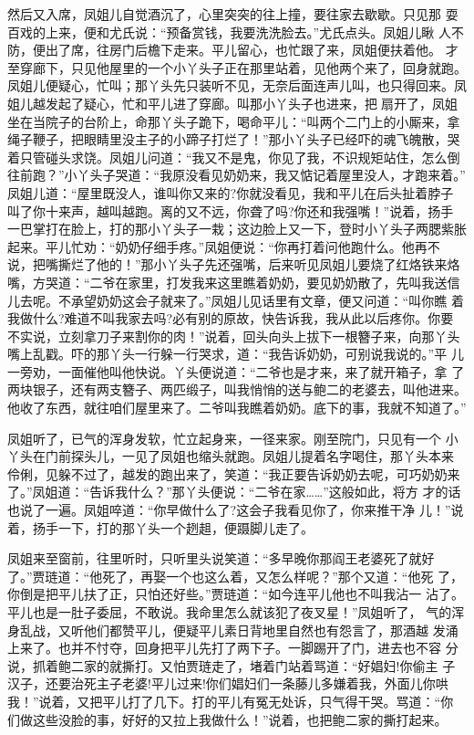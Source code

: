 然后又入席，凤姐儿自觉酒沉了，心里突突的往上撞，要往家去歇歇。只见那
耍百戏的上来，便和尤氏说：“预备赏钱，我要洗洗脸去。”尤氏点头。凤姐儿瞅
人不防，便出了席，往房门后檐下走来。平儿留心，也忙跟了来，凤姐便扶着他。
才至穿廊下，只见他屋里的一个小丫头子正在那里站着，见他两个来了，回身就跑。
凤姐儿便疑心，忙叫；那丫头先只装听不见，无奈后面连声儿叫，也只得回来。凤
姐儿越发起了疑心，忙和平儿进了穿廊。叫那小丫头子也进来，把扇开了，凤姐
坐在当院子的台阶上，命那丫头子跪下，喝命平儿：“叫两个二门上的小厮来，拿
绳子鞭子，把眼睛里没主子的小蹄子打烂了！”那小丫头子已经吓的魂飞魄散，哭
着只管碰头求饶。凤姐儿问道：“我又不是鬼，你见了我，不识规矩站住，怎么倒
往前跑？”小丫头子哭道：“我原没看见奶奶来，我又惦记着屋里没人，才跑来着。”
凤姐儿道：“屋里既没人，谁叫你又来的?你就没看见，我和平儿在后头扯着脖子
叫了你十来声，越叫越跑。离的又不远，你聋了吗?你还和我强嘴！”说着，扬手
一巴掌打在脸上，打的那小丫头子一栽；这边脸上又一下，登时小丫头子两腮紫胀
起来。平儿忙劝：“奶奶仔细手疼。”凤姐便说：“你再打着问他跑什么。他再不
说，把嘴撕烂了他的！”那小丫头子先还强嘴，后来听见凤姐儿要烧了红烙铁来烙
嘴，方哭道：“二爷在家里，打发我来这里瞧着奶奶，要见奶奶散了，先叫我送信
儿去呢。不承望奶奶这会子就来了。”凤姐儿见话里有文章，便又问道：“叫你瞧
着我做什么?难道不叫我家去吗?必有别的原故，快告诉我，我从此以后疼你。你要
不实说，立刻拿刀子来割你的肉！”说着，回头向头上拔下一根簪子来，向那丫头
嘴上乱戳。吓的那丫头一行躲一行哭求，道：“我告诉奶奶，可别说我说的。”平
儿一旁劝，一面催他叫他快说。丫头便说道：“二爷也是才来，来了就开箱子，拿
了两块银子，还有两支簪子、两匹缎子，叫我悄悄的送与鲍二的老婆去，叫他进来。
他收了东西，就往咱们屋里来了。二爷叫我瞧着奶奶。底下的事，我就不知道了。”

凤姐听了，已气的浑身发软，忙立起身来，一径来家。刚至院门，只见有一个
小丫头在门前探头儿，一见了凤姐也缩头就跑。凤姐儿提着名字喝住，那丫头本来
伶俐，见躲不过了，越发的跑出来了，笑道：“我正要告诉奶奶去呢，可巧奶奶来
了。”凤姐道：“告诉我什么？”那丫头便说：“二爷在家……”这般如此，将方
才的话也说了一遍。凤姐啐道：“你早做什么了?这会子我看见你了，你来推干净
儿！”说着，扬手一下，打的那丫头一个趔趄，便蹑脚儿走了。

凤姐来至窗前，往里听时，只听里头说笑道：“多早晚你那阎王老婆死了就好
了。”贾琏道：“他死了，再娶一个也这么着，又怎么样呢？”那个又道：“他死
了，你倒是把平儿扶了正，只怕还好些。”贾琏道：“如今连平儿他也不叫我沾一
沾了。平儿也是一肚子委屈，不敢说。我命里怎么就该犯了夜叉星！”凤姐听了，
气的浑身乱战，又听他们都赞平儿，便疑平儿素日背地里自然也有怨言了，那酒越
发涌上来了。也并不忖夺，回身把平儿先打了两下子。一脚踢开了门，进去也不容
分说，抓着鲍二家的就撕打。又怕贾琏走了，堵着门站着骂道：“好娼妇!你偷主
子汉子，还要治死主子老婆!平儿过来!你们娼妇们一条藤儿多嫌着我，外面儿你哄
我！”说着，又把平儿打了几下。打的平儿有冤无处诉，只气得干哭。骂道：“你
们做这些没脸的事，好好的又拉上我做什么！”说着，也把鲍二家的撕打起来。

